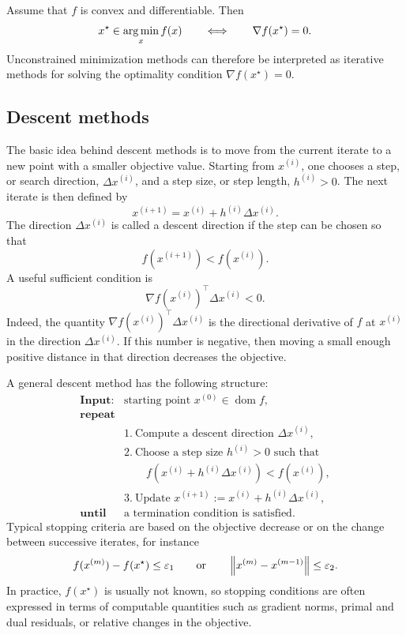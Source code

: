 \begin{theorembox}
Assume that \(f\) is convex and differentiable. Then
\[
    x^\star\in\operatorname*{arg\,min}_x f(x)
    \qquad \Longleftrightarrow \qquad
    \nabla f(x^\star)=0.
\]
Unconstrained minimization methods can therefore be interpreted as iterative methods for
solving the optimality condition \(\nabla f(x^\star)=0\).
\end{theorembox}

\subsection{Descent methods}

The basic idea behind descent methods is to move from the current iterate to a new point with
a smaller objective value. Starting from \(x^{(i)}\), one chooses a step, or search direction,
\(\Delta x^{(i)}\), and a step size, or step length, \(h^{(i)}>0\). The next iterate is then
defined by
\[
    x^{(i+1)}
    =
    x^{(i)}+h^{(i)}\Delta x^{(i)}.
\]
The direction \(\Delta x^{(i)}\) is called a descent direction if the step can be chosen so that
\[
    f(x^{(i+1)})<f(x^{(i)}).
\]
A useful sufficient condition is
\[
    \nabla f(x^{(i)})^\top \Delta x^{(i)}<0.
\]
Indeed, the quantity \(\nabla f(x^{(i)})^\top \Delta x^{(i)}\) is the directional derivative of
\(f\) at \(x^{(i)}\) in the direction \(\Delta x^{(i)}\). If this number is negative, then moving a
small enough positive distance in that direction decreases the objective.

A general descent method has the following structure:
\[
\begin{array}{ll}
\textbf{Input:} & \text{starting point } x^{(0)}\in\operatorname{dom} f,\\[1mm]
\textbf{repeat} & \\
& 1.\ \text{Compute a descent direction } \Delta x^{(i)},\\
& 2.\ \text{Choose a step size } h^{(i)}>0 \text{ such that}\\
& \qquad f(x^{(i)}+h^{(i)}\Delta x^{(i)})<f(x^{(i)}),\\
& 3.\ \text{Update } x^{(i+1)}:=x^{(i)}+h^{(i)}\Delta x^{(i)},\\[1mm]
\textbf{until} & \text{a termination condition is satisfied.}
\end{array}
\]
Typical stopping criteria are based on the objective decrease or on the change between
successive iterates, for instance
\[
    f(x^{(m)})-f(x^\star)\leq \varepsilon_1
    \qquad \text{or} \qquad
    \left\lVert x^{(m)}-x^{(m-1)} \right\rVert\leq \varepsilon_2.
\]
In practice, \(f(x^\star)\) is usually not known, so stopping conditions are often expressed in
terms of computable quantities such as gradient norms, primal and dual residuals, or relative
changes in the objective.

